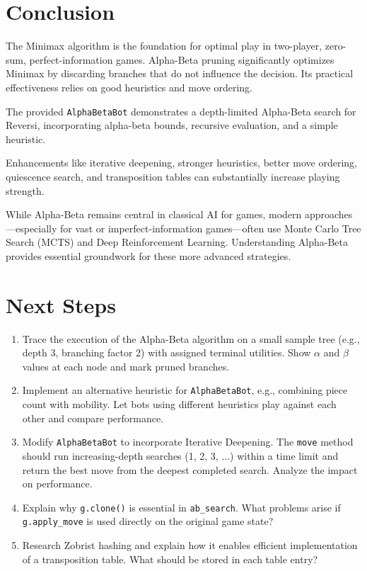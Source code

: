 \documentclass[11pt]{article}
\begin{document}
\section{Conclusion}

The Minimax algorithm is the foundation for optimal play in two-player, zero-sum, perfect-information games. Alpha-Beta pruning significantly optimizes Minimax by discarding branches that do not influence the decision. Its practical effectiveness relies on good heuristics and move ordering.

The provided \texttt{AlphaBetaBot} demonstrates a depth-limited Alpha-Beta search for Reversi, incorporating alpha-beta bounds, recursive evaluation, and a simple heuristic.

Enhancements like iterative deepening, stronger heuristics, better move ordering, quiescence search, and transposition tables can substantially increase playing strength.

While Alpha-Beta remains central in classical AI for games, modern approaches—especially for vast or imperfect-information games—often use Monte Carlo Tree Search (MCTS) and Deep Reinforcement Learning. Understanding Alpha-Beta provides essential groundwork for these more advanced strategies.

\section{Next Steps}

\begin{enumerate}
    \item Trace the execution of the Alpha-Beta algorithm  on a small sample tree (e.g., depth 3, branching factor 2) with assigned terminal utilities. Show $\alpha$ and $\beta$ values at each node and mark pruned branches.

    \item Implement an alternative heuristic for \texttt{AlphaBetaBot}, e.g., combining piece count with mobility. Let bots using different heuristics play against each other and compare performance.

    \item Modify \texttt{AlphaBetaBot} to incorporate Iterative Deepening. The \texttt{move} method should run increasing-depth searches (1, 2, 3, ...) within a time limit and return the best move from the deepest completed search. Analyze the impact on performance.

    \item Explain why \texttt{g.clone()} is essential in \texttt{ab\_search}. What problems arise if \texttt{g.apply\_move} is used directly on the original game state?

    \item Research Zobrist hashing and explain how it enables efficient implementation of a transposition table. What should be stored in each table entry?
\end{enumerate}
\end{document}
